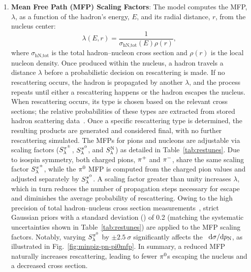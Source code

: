     \begin{enumerate}
        \item \textbf{Mean Free Path (MFP) Scaling Factors}:
        The model computes the MFP, $\lambda$, as a function of the hadron's energy, $E$, and its radial distance, $r$, from the nucleus center:
        \begin{equation}
            \lambda(E,r) = \frac{1}{\sigma_\textrm{hN,tot}(E)\rho(r)},
        \end{equation}
        where $\sigma_\textrm{hN,tot}$ is the total hadron–nucleon cross section and $\rho(r)$ is the local nucleon density. 
        Once produced within the nucleus, a hadron travels a distance $\lambda$ before a probabilistic decision on rescattering is made. 
        If no rescattering occurs, the hadron is propagated by another $\lambda$, and the process repeats until either a rescattering happens or the hadron escapes the nucleus. 
        When rescattering occurs, its type is chosen based on the relevant cross sections; the relative probabilities of these types are extracted from stored hadron scattering data~\cite{LADS:1999dyv,Navon:1983xj,Carroll:1976hj,Clough:1974qt,BAUHOFF1986429,Mashnik:2000up,Ishibashi:1997gbe}. 
        Once a specific rescattering type is determined, the resulting products are generated and considered final, with no further rescattering simulated.
        The MFPs for pions and nucleons are adjustable via scaling factors ($S_\lambda^{\pi^{\pm}}$, $S_\lambda^{\pi^{0}}$, and $S_\lambda^\textrm{N}$) as detailed in Table~\ref{tab:restunes}. 
        Due to isospin symmetry, both charged pions, $\pi^+$ and $\pi^-$, share the same scaling factor $S_\lambda^{\pi^{\pm}}$, while the $\pi^0$ MFP is computed from the charged pion values and adjusted separately by $S_\lambda^{\pi^{0}}$. 
        A scaling factor greater than unity increases $\lambda$, which in turn reduces the number of propagation steps necessary for escape and diminishes the average probability of rescattering. 
        Owing to the high precision of total hadron–nucleus cross section measurements~\cite{LADS:1999dyv,Navon:1983xj,Carroll:1976hj,Clough:1974qt,BAUHOFF1986429}, strict Gaussian priors with a standard deviation (\sigma) of 0.2 (matching the systematic uncertainties shown in Table~\ref{tab:restunes}) are applied to the MFP scaling factors. 
        Notably, varying $S_\lambda^{\pi^{0}}$ by $\pm2.5~\sigma$ significantly affects the \minpiz\ $\textrm{d}\sigma/\textrm{d}p_\textrm{N}$, as illustrated in Fig.~\ref{fig:minpiz-pn-pi0mfp}. 
        In summary, a reduced MFP naturally increases rescattering, leading to fewer $\pi^0$s escaping the nucleus and a decreased cross section.

\end{enumerate}
